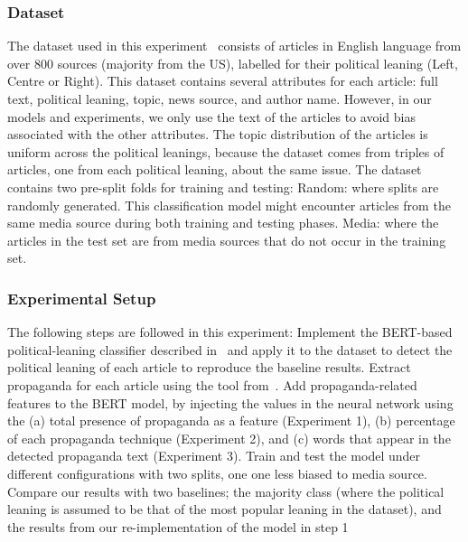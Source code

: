 \subsubsection{Dataset}
The dataset used in this experiment~\citep{baly2020we} consists of articles in English language from over 800 sources (majority from the US), labelled for their political leaning (Left, Centre or Right). This dataset contains several attributes for each article: full text, political leaning, topic, news source, and author name. However, in our models and experiments, we only use the text of the articles to avoid bias associated with the other attributes. The topic distribution of the articles is uniform across the political leanings, because the dataset comes from triples of articles, one from each political leaning, about the same issue. The dataset contains two pre-split folds for training and testing:
Random: where splits are randomly generated. This classification model might encounter articles from the same media source during both training and testing phases.
Media: where the articles in the test set are from media sources that do not occur in the training set.

\subsubsection{Experimental Setup}

The following steps are followed in this experiment:
 Implement the BERT-based political-leaning classifier described in~\citet{baly2020we} and apply it to the dataset to detect the political leaning of each article to reproduce the baseline results.
 Extract propaganda for each article using the tool from~\citet{da2019fine}.
Add propaganda-related features to the BERT model, by injecting the values in the neural network using the (a) total presence of propaganda as a feature (Experiment 1), (b) percentage of each propaganda technique (Experiment 2), and (c) words that appear in the detected propaganda text (Experiment 3).
Train and test the model under different configurations with two splits, one   one less biased to media source.
Compare our results with two baselines; the majority class (where the political leaning is assumed to be that of the most popular leaning in the dataset), and the results from our re-implementation of the model in step 1

